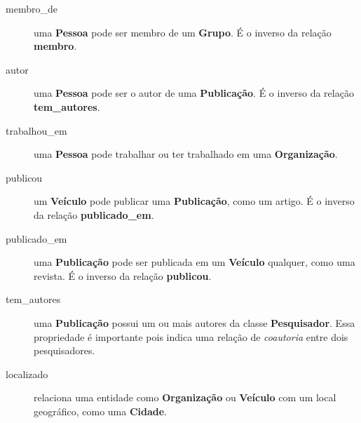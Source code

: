 \begin{description}
  \item[membro\_de] uma \textbf{Pessoa} pode ser membro de um \textbf{Grupo}. É o inverso da relação \textbf{membro}.
  \item[autor] uma \textbf{Pessoa} pode ser o autor de uma \textbf{Publicação}. É o inverso da relação \textbf{tem\_autores}.
  \item[trabalhou\_em] uma \textbf{Pessoa} pode trabalhar ou ter trabalhado em uma \textbf{Organização}.
  \item[publicou] um \textbf{Veículo} pode publicar uma \textbf{Publicação}, como um artigo. É o inverso da relação \textbf{publicado\_em}.
  \item[publicado\_em] uma \textbf{Publicação} pode ser publicada em
  um \textbf{Veículo} qualquer, como uma revista. É o inverso da relação \textbf{publicou}.
  \item[tem\_autores] uma \textbf{Publicação} possui um ou mais autores da classe
  \textbf{Pesquisador}. Essa propriedade é importante pois indica uma relação de
  \textit{coautoria} entre dois pesquisadores.
  \item[localizado] relaciona uma entidade como \textbf{Organização} ou \textbf{Veículo} com um local geográfico, como uma \textbf{Cidade}.
\end{description}


